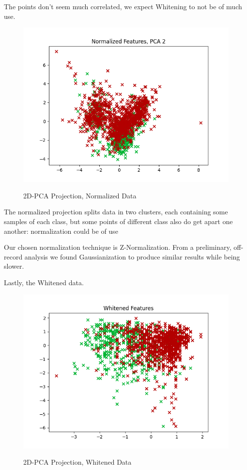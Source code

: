 \documentclass[hidelinks, 12pt, twocolumn]{article}
\begin{document}
The points don't seem much correlated, we expect Whitening to not be of much use.

\begin{figure}[H] 
    {\includegraphics[width=\linewidth]{2DNorm.png}}
    \caption{2D-PCA Projection, Normalized Data}
    \label{fig:2DNORM}
\end{figure}

The normalized projection splits data in two clusters, 
each containing some samples of each class, 
but some points of different class also do get apart one another:
normalization could be of use

Our chosen normalization technique is Z-Normalization.
From a preliminary, off-record analysis we found Gaussianization to produce
similar results while being slower.

Lastly, the Whitened data.

\begin{figure}[H] 
    {\includegraphics[width=\linewidth]{2DWhitened.png}}
    \label{fig:2DWHI}
    \caption{2D-PCA Projection, Whitened Data}
\end{figure}
\end{document}
